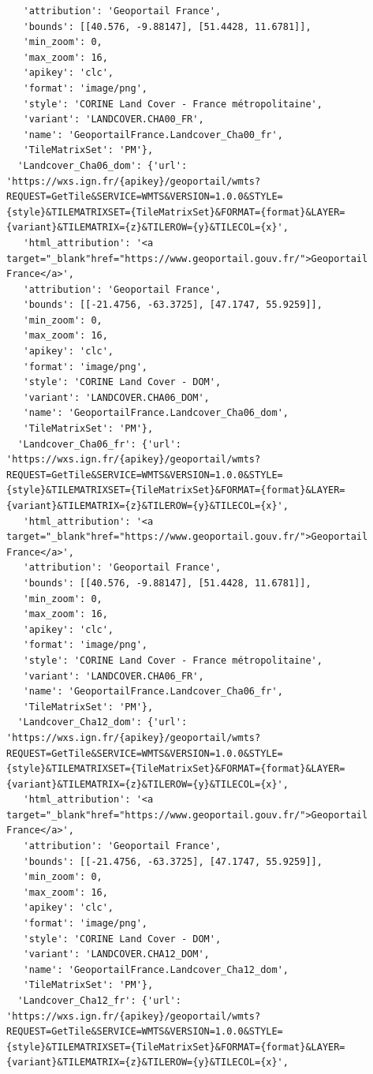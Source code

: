 \documentclass[
  letterpaper,
  DIV=11,
  numbers=noendperiod]{scrreprt}
\begin{document}
\begin{verbatim}
   'attribution': 'Geoportail France',
   'bounds': [[40.576, -9.88147], [51.4428, 11.6781]],
   'min_zoom': 0,
   'max_zoom': 16,
   'apikey': 'clc',
   'format': 'image/png',
   'style': 'CORINE Land Cover - France métropolitaine',
   'variant': 'LANDCOVER.CHA00_FR',
   'name': 'GeoportailFrance.Landcover_Cha00_fr',
   'TileMatrixSet': 'PM'},
  'Landcover_Cha06_dom': {'url': 'https://wxs.ign.fr/{apikey}/geoportail/wmts?REQUEST=GetTile&SERVICE=WMTS&VERSION=1.0.0&STYLE={style}&TILEMATRIXSET={TileMatrixSet}&FORMAT={format}&LAYER={variant}&TILEMATRIX={z}&TILEROW={y}&TILECOL={x}',
   'html_attribution': '<a target="_blank"href="https://www.geoportail.gouv.fr/">Geoportail France</a>',
   'attribution': 'Geoportail France',
   'bounds': [[-21.4756, -63.3725], [47.1747, 55.9259]],
   'min_zoom': 0,
   'max_zoom': 16,
   'apikey': 'clc',
   'format': 'image/png',
   'style': 'CORINE Land Cover - DOM',
   'variant': 'LANDCOVER.CHA06_DOM',
   'name': 'GeoportailFrance.Landcover_Cha06_dom',
   'TileMatrixSet': 'PM'},
  'Landcover_Cha06_fr': {'url': 'https://wxs.ign.fr/{apikey}/geoportail/wmts?REQUEST=GetTile&SERVICE=WMTS&VERSION=1.0.0&STYLE={style}&TILEMATRIXSET={TileMatrixSet}&FORMAT={format}&LAYER={variant}&TILEMATRIX={z}&TILEROW={y}&TILECOL={x}',
   'html_attribution': '<a target="_blank"href="https://www.geoportail.gouv.fr/">Geoportail France</a>',
   'attribution': 'Geoportail France',
   'bounds': [[40.576, -9.88147], [51.4428, 11.6781]],
   'min_zoom': 0,
   'max_zoom': 16,
   'apikey': 'clc',
   'format': 'image/png',
   'style': 'CORINE Land Cover - France métropolitaine',
   'variant': 'LANDCOVER.CHA06_FR',
   'name': 'GeoportailFrance.Landcover_Cha06_fr',
   'TileMatrixSet': 'PM'},
  'Landcover_Cha12_dom': {'url': 'https://wxs.ign.fr/{apikey}/geoportail/wmts?REQUEST=GetTile&SERVICE=WMTS&VERSION=1.0.0&STYLE={style}&TILEMATRIXSET={TileMatrixSet}&FORMAT={format}&LAYER={variant}&TILEMATRIX={z}&TILEROW={y}&TILECOL={x}',
   'html_attribution': '<a target="_blank"href="https://www.geoportail.gouv.fr/">Geoportail France</a>',
   'attribution': 'Geoportail France',
   'bounds': [[-21.4756, -63.3725], [47.1747, 55.9259]],
   'min_zoom': 0,
   'max_zoom': 16,
   'apikey': 'clc',
   'format': 'image/png',
   'style': 'CORINE Land Cover - DOM',
   'variant': 'LANDCOVER.CHA12_DOM',
   'name': 'GeoportailFrance.Landcover_Cha12_dom',
   'TileMatrixSet': 'PM'},
  'Landcover_Cha12_fr': {'url': 'https://wxs.ign.fr/{apikey}/geoportail/wmts?REQUEST=GetTile&SERVICE=WMTS&VERSION=1.0.0&STYLE={style}&TILEMATRIXSET={TileMatrixSet}&FORMAT={format}&LAYER={variant}&TILEMATRIX={z}&TILEROW={y}&TILECOL={x}',

\end{verbatim}
\end{document}
